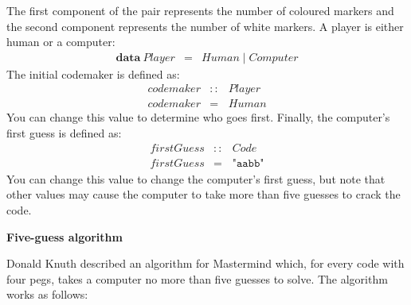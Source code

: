 \documentclass{cs256-shared/cs256}
\begin{document}
The first component of the pair represents the number of coloured markers and the second component represents the number of white markers. A player is either human or a computer:
\begin{displaymath}
\begin{array}{lcl}
\mathbf{data}~\mathit{Player} & = & \mathit{Human} \mid \mathit{Computer}
\end{array}
\end{displaymath}
The initial codemaker is defined as:
\begin{displaymath}
\begin{array}{lcl}
\mathit{codemaker} & :: & \mathit{Player} \\
\mathit{codemaker} & = & \mathit{Human}
\end{array}
\end{displaymath}
You can change this value to determine who goes first. Finally, the computer's first guess is defined as:
\begin{displaymath}
\begin{array}{lcl}
\mathit{firstGuess} & :: & \mathit{Code} \\
\mathit{firstGuess} & = & \texttt{"aabb"}
\end{array}
\end{displaymath}
You can change this value to change the computer's first guess, but note that other values may cause the computer to take more than five guesses to crack the code.

\textbf{Five-guess algorithm}

Donald Knuth described an algorithm for Mastermind which, for every code with four pegs, takes a computer no more than five guesses to solve. The algorithm works as follows:
\end{document}
